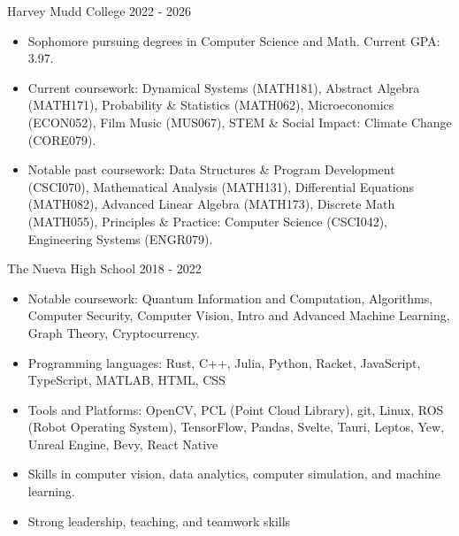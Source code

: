 \documentclass[9pt]{resume}
\begin{document}
    \begin{experiencelist}
        \experiencenocompany 
            {Harvey Mudd College}
            {2022 - 2026}
            {\begin{itemize}[noitemsep, topsep=1pt]
                \item {Sophomore pursuing degrees in Computer Science and Math. Current GPA: 3.97. }
                \item {Current coursework: Dynamical Systems (MATH181), Abstract Algebra (MATH171), Probability \& Statistics (MATH062), Microeconomics (ECON052), Film Music (MUS067), STEM \& Social Impact: Climate Change (CORE079).}
                \item {Notable past coursework: Data Structures \& Program Development (CSCI070), Mathematical Analysis (MATH131), Differential Equations (MATH082), Advanced Linear Algebra (MATH173), Discrete Math (MATH055), Principles \& Practice: Computer Science (CSCI042), Engineering Systems (ENGR079).}
            \end{itemize}}
        \experiencenocompany
            {The Nueva High School}
            {2018 - 2022}
            {\begin{itemize}[noitemsep, topsep=1pt]
                \item Notable coursework: Quantum Information and Computation, Algorithms, Computer Security, Computer Vision, Intro and Advanced Machine Learning, Graph Theory, Cryptocurrency.
            \end{itemize}}
    \end{experiencelist}
    \vspace{-0.2cm}
    \begin{itemize}[noitemsep, topsep=0pt]
        \item Programming languages: Rust, C++, Julia, Python, Racket, JavaScript, TypeScript, MATLAB, HTML, CSS
        \item Tools and Platforms: OpenCV, PCL (Point Cloud Library), git, Linux, ROS (Robot Operating System), TensorFlow, Pandas, Svelte, Tauri, Leptos, Yew, Unreal Engine, Bevy, React Native
        \item Skills in computer vision, data analytics, computer simulation, and machine learning.
        \item Strong leadership, teaching, and teamwork skills
    \end{itemize}
\end{document}
